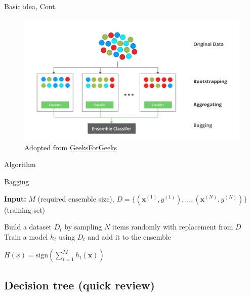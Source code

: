 \documentclass[serif, aspectratio=169]{beamer}
\begin{document}
\begin{frame}{Basic idea, Cont.}
    \begin{center}
    \begin{figure}[bh]
        \includegraphics[width=\textwidth]{pic/bagging.png}
        {\scriptsize Adopted from \href{https://www.geeksforgeeks.org/bagging-vs-boosting-in-machine-learning/}{GeeksForGeeks}}
    \end{figure}
    \endminipage
    \end{center}
\end{frame}

\begin{frame}{Algorithm}
    \begin{algorithm}[H]
    \caption{Bagging}\label{alg:Bagging}
    \begin{algorithmic}[1]
        \State \textbf{Input:} $M$ (required ensemble size), $D = \{(\boldsymbol{x}^{(1)}, y^{(1)}), \dots, (\boldsymbol{x}^{(N)}, y^{(N)})\}$ (training set)
    
            \State Build a dataset $D_t$ by sampling $N$ items randomly with replacement from $D$
            \State Train a model $h_t$ using $D_t$ and add it to the ensemble
        \EndFor
    
        \State $H(x) = \text{sign}\left(\sum_{t=1}^M h_t(\boldsymbol{x})\right)$
    \end{algorithmic}
    \end{algorithm}
\end{frame}

\subsection{Decision tree (quick review)}
\end{document}
